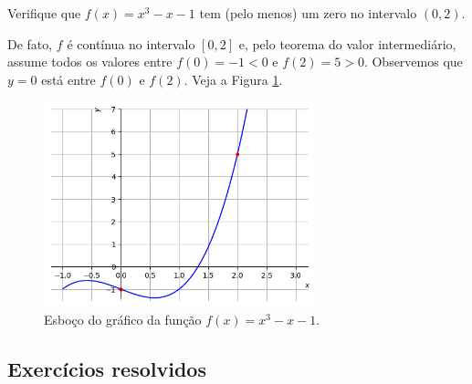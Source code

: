 \cleardoublepage\documentclass[../main.tex]{subfiles}
\begin{document}
\begin{ex}
Verifique que $f(x)=x^3-x-1$ tem (pelo menos) um zero no intervalo $(0, 2)$.\\
\begin{solution}

De fato, $f$ é contínua no intervalo $[0,2]$ e, pelo teorema do valor intermediário, assume todos os valores entre $f(0)=-1<0$ e $f(2)=5>0$. Observemos que $y = 0$ está entre $f(0)$ e $f(2)$. Veja a Figura \ref{fig:cap_lim_ex_teoint}.

  \begin{figure}[htb]
    \centering
    \includegraphics[width=0.7\textwidth]{fig_lim/fig_cap_lim_ex_teoint}
    \caption{Esboço do gráfico da função $f(x) = x^3-x-1$.}
    \label{fig:cap_lim_ex_teoint}
  \end{figure}
\end{solution}
\end{ex}

\subsection{Exercícios resolvidos}
\end{document}
